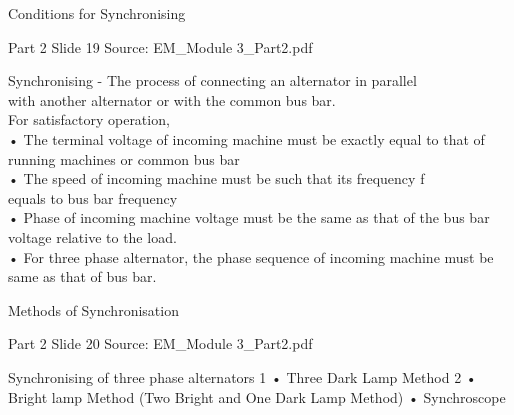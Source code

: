 \documentclass[11pt,a4paper]{article}
\begin{document}
\begin{mdframed}[roundcorner=9pt,backgroundcolor=white,linecolor=anthGreen,linewidth=1pt,innerleftmargin=12pt,innerrightmargin=12pt,innertopmargin=10pt,innerbottommargin=10pt,skipabove=8pt,skipbelow=10pt]
{\HeadingFont\fontsize{15}{18}\selectfont\color{anthDark}Conditions for Synchronising\par}
{\color{anthMid}\small Part 2 \textbullet{} Slide 19 \textbullet{} Source: EM\_Module 3\_Part2.pdf\par}
\vspace{0.5em}
{\small
\textcolor{anthGreen}{\textbullet}\hspace{0.65em}Synchronising - The process of connecting an alternator in parallel\\
with another alternator or with the common bus bar.\\
\smallskip
\textcolor{anthGreen}{\textbullet}\hspace{0.65em}For satisfactory operation,\\
\smallskip
• The terminal voltage of incoming machine must be exactly equal to that of running machines or common bus bar\\
• The speed of incoming machine must be such that its frequency f\\
equals to bus bar frequency\\
• Phase of incoming machine voltage must be the same as that of the bus bar voltage relative to the load.\\
• For three phase alternator, the phase sequence of incoming machine must be same as that of bus bar.\\

}
\end{mdframed}

\begin{mdframed}[roundcorner=9pt,backgroundcolor=white,linecolor=anthOrange,linewidth=1pt,innerleftmargin=12pt,innerrightmargin=12pt,innertopmargin=10pt,innerbottommargin=10pt,skipabove=8pt,skipbelow=10pt]
{\HeadingFont\fontsize{15}{18}\selectfont\color{anthDark}Methods of Synchronisation\par}
{\color{anthMid}\small Part 2 \textbullet{} Slide 20 \textbullet{} Source: EM\_Module 3\_Part2.pdf\par}
\vspace{0.5em}
{\small
\smallskip
Synchronising of three phase alternators 1   •   Three Dark Lamp Method 2   •   Bright lamp Method (Two Bright and One Dark Lamp Method) •   Synchroscope\\

}
\end{mdframed}
\end{document}
